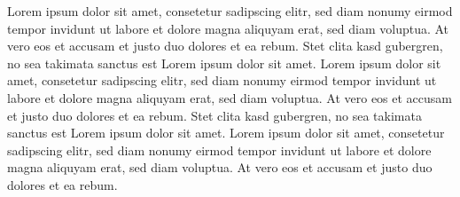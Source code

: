 \documentclass[journal]{vgtc}                %
\begin{document}
Lorem ipsum dolor sit amet, consetetur sadipscing elitr, sed diam
nonumy eirmod tempor invidunt ut labore et dolore magna aliquyam erat,
sed diam voluptua. At vero eos et accusam et justo duo dolores et ea
rebum. Stet clita kasd gubergren, no sea takimata sanctus est Lorem
ipsum dolor sit amet. Lorem ipsum dolor sit amet, consetetur
sadipscing elitr, sed diam nonumy eirmod tempor invidunt ut labore et
dolore magna aliquyam erat, sed diam voluptua. At vero eos et accusam
et justo duo dolores et ea rebum. Stet clita kasd gubergren, no sea
takimata sanctus est Lorem ipsum dolor sit amet. Lorem ipsum dolor sit
amet, consetetur sadipscing elitr, sed diam nonumy eirmod tempor
invidunt ut labore et dolore magna aliquyam erat, sed diam
voluptua. At vero eos et accusam et justo duo dolores et ea
rebum.



%

%
%
%

\end{document}
